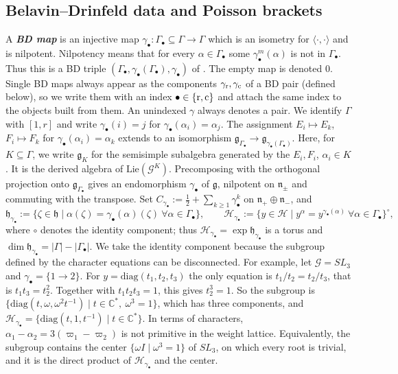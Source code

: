 \documentclass[a4paper]{amsart}
\numberwithin{equation}{section}
\theoremstyle{definition}
\theoremstyle{remark}
\newcommand{\bbC}{\mathbb{C}}
\newcommand{\mfh}{\mathfrak{h}}
\newcommand{\mfg}{\mathfrak{g}}
\newcommand{\mfn}{\mathfrak{n}}
\newcommand{\mcG}{\mathcal{G}}
\newcommand{\mcH}{\mathcal{H}}
\newcommand{\Kil}[2]{\langle #1, #2\rangle}
\newcommand{\rr}{{\rm r}}
\newcommand{\cc}{{\rm c}}
\newcommand{\newword}[1]{\textbf{\emph{#1}}}
\begin{document}
\subsection{Belavin--Drinfeld data and Poisson brackets}
\label{sec: BD}
A \newword{BD map} is an injective map $\gamma_\bullet:\Gamma_\bullet\subseteq\Gamma\to\Gamma$ which is an isometry for $\Kil{\cdot}{\cdot}$ and is nilpotent.
Nilpotency means that for every $\alpha\in\Gamma_\bullet$ some $\gamma_\bullet^m(\alpha)$ is not in $\Gamma_\bullet$.
Thus this is a BD triple $(\Gamma_\bullet,\gamma_\bullet(\Gamma_\bullet),\gamma_\bullet)$ of \cite{BD82}.
The empty map is denoted $0$.
Single BD maps always appear as the components $\gamma_{\rr},\gamma_{\cc}$ of a BD pair (defined below), so we write them with an index $\bullet\in\{\rr,\cc\}$ and attach the same index to the objects built from them. An unindexed $\gamma$ always denotes a pair.
We identify $\Gamma$ with $[1,r]$ and write $\gamma_\bullet(i)=j$ for $\gamma_\bullet(\alpha_i)=\alpha_j$.
The assignment $E_i\mapsto E_k$, $F_i\mapsto F_k$ for $\gamma_\bullet(\alpha_i)=\alpha_k$ extends to an isomorphism $\mfg_{\Gamma_\bullet}\to\mfg_{\gamma_\bullet(\Gamma_\bullet)}$.
Here, for $K\subseteq\Gamma$, we write $\mfg_K$ for the semisimple subalgebra generated by the $E_i,F_i$, $\alpha_i\in K$.
It is the derived algebra of $\mathrm{Lie}(\mcG^K)$.
Precomposing with the orthogonal projection onto $\mfg_{\Gamma_\bullet}$ gives an endomorphism $\gamma_\bullet$ of $\mfg$, nilpotent on $\mfn_\pm$ and commuting with the transpose.
Set $C_{\gamma_\bullet}:=\frac12+\sum_{k\ge1}\gamma_\bullet^k$ on $\mfn_+\oplus\mfn_-$, and
\[
  \mfh_{\gamma_\bullet}:=\{\zeta\in\mfh\mid\alpha(\zeta)=\gamma_\bullet(\alpha)(\zeta)\ \forall\alpha\in\Gamma_\bullet\},
  \qquad
  \mcH_{\gamma_\bullet}:=\{y\in\mcH\mid y^\alpha=y^{\gamma_\bullet(\alpha)}\ \forall\alpha\in\Gamma_\bullet\}^{\circ},
\]
where $\circ$ denotes the identity component; thus $\mcH_{\gamma_\bullet}=\exp\mfh_{\gamma_\bullet}$ is a torus and $\dim\mfh_{\gamma_\bullet}=|\Gamma|-|\Gamma_\bullet|$.
We take the identity component because the subgroup defined by the character equations can be disconnected.
For example, let $\mcG=SL_3$ and $\gamma_\bullet=\{1\to2\}$.
For $y=\mathrm{diag}(t_1,t_2,t_3)$ the only equation is $t_1/t_2=t_2/t_3$, that is $t_1t_3=t_2^2$. Together with $t_1t_2t_3=1$, this gives $t_2^3=1$.
So the subgroup is $\{\mathrm{diag}(t,\omega,\omega^2t^{-1})\mid t\in\bbC^*,\ \omega^3=1\}$, which has three components, and $\mcH_{\gamma_\bullet}=\{\mathrm{diag}(t,1,t^{-1})\mid t\in\bbC^*\}$.
In terms of characters, $\alpha_1-\alpha_2=3(\varpi_1-\varpi_2)$ is not primitive in the weight lattice.
  Equivalently, the subgroup contains the center $\{\omega I\mid\omega^3=1\}$ of $SL_3$, on which every root is trivial, and it is the direct product of $\mcH_{\gamma_\bullet}$ and the center.
\end{document}
